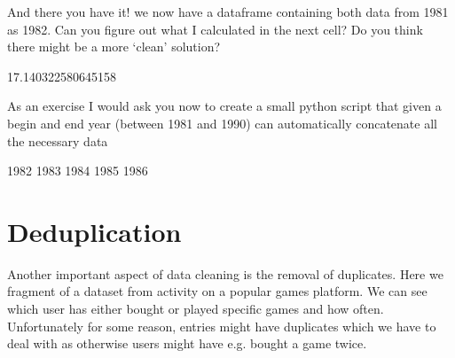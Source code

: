 \documentclass[letterpaper,10pt,english]{jupyterBook}
\begin{document}
\sphinxAtStartPar
And there you have it! we now have a dataframe containing both data from 1981 as 1982.
Can you figure out what I calculated in the next cell? Do you think there might be a more ‘clean’ solution?

\begin{sphinxVerbatim}[commandchars=\\\{\}]
\PYG{p}{[}\PYG{p}{[}\PYG{p}{]} \PYG{p}{]}
\end{sphinxVerbatim}

\begin{sphinxVerbatim}[commandchars=\\\{\}]
17.140322580645158
\end{sphinxVerbatim}

\sphinxAtStartPar
As an exercise I would ask you now to create a small python script that given a begin and end year (between 1981 and 1990) can automatically concatenate all the necessary data

\begin{sphinxVerbatim}[commandchars=\\\{\}]
   
\end{sphinxVerbatim}

\begin{sphinxVerbatim}[commandchars=\\\{\}]
1982
1983
1984
1985
1986
\end{sphinxVerbatim}


\section{Deduplication}
\label{\detokenize{c2_data_preparation/concatenation_deduplication:deduplication}}
\sphinxAtStartPar
Another important aspect of data cleaning is the removal of duplicates.
Here we fragment of a dataset from activity on a popular games platform.
We can see which user has either bought or played specific games and how often.
Unfortunately for some reason, entries might have duplicates which we have to deal with as otherwise users might have e.g. bought a game twice.
\end{document}
